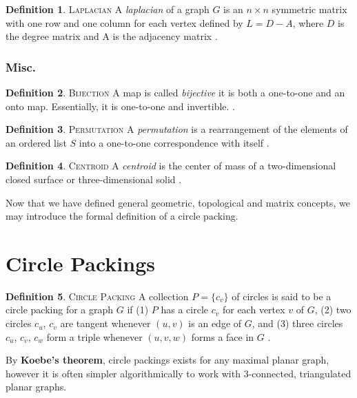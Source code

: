\documentclass[11pt]{article}
\theoremstyle{definition}
\newtheorem{definition}{Definition}[section]
\begin{document}
	\theoremstyle{definition}
	\begin{definition}{\textsc{Laplacian}}
		A \emph{laplacian} of a graph $G$ is an $n \times n$ symmetric matrix with one row and one column for each vertex defined by $L = D - A$, where $D$ is the degree matrix and A is the adjacency matrix \cite{mathworld:Laplacian}.
	\end{definition}

\subsubsection{Misc.}
	\theoremstyle{definition}
	\begin{definition}{\textsc{Bijection}}
		A map is called \emph{bijective} it is both a one-to-one and an onto map. 
		Essentially, it is one-to-one and invertible. \cite{mathworld:Bijection}. 
	\end{definition}
	
	\theoremstyle{definition}
	\begin{definition}{\textsc{Permutation}}
		 A \emph{permutation} is a rearrangement of the elements of an ordered list $S$ into a one-to-one correspondence with itself \cite{mathworld:Permutation}.
	\end{definition}
	
	\theoremstyle{definition}
	\begin{definition}{\textsc{Centroid}}
		A \emph{centroid} is the center of mass of a two-dimensional closed surface or three-dimensional solid \cite{mathworld:Centroid}.
	\end{definition}
	Now that we have defined general geometric, topological and matrix concepts, we may introduce the formal definition of a circle packing.

\section{Circle Packings}
	\theoremstyle{definition}
	\begin{definition}{\textsc{Circle Packing}}
		A collection $P = \{c_v\}$ of circles is said to be a circle packing for a graph $G$ if 
		(1) $P$ has a circle $c_v$ for each vertex $v$ of $G$, 
		(2) two circles $c_u$, $c_v$ are tangent whenever $(u,v)$ is an edge of $G$, and 
		(3) three circles $c_u$, $c_v$, $c_w$ form a triple whenever $(u,v,w)$ forms a face in $G$ \cite{stephenson05introduction}.
	\end{definition}

	By \textbf{Koebe's theorem}, circle packings exists for any maximal planar graph, however it is often simpler algorithmically to work with 3-connected, triangulated planar graphs.
\end{document}
